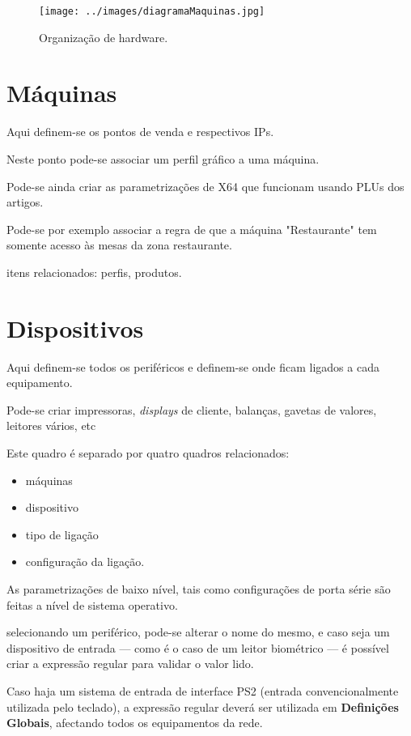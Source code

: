 \documentclass[a4paper,11pt,openany]{memoir}
\begin{document}
\begin{figure}
\texttt{[image: ../images/diagramaMaquinas.jpg]}
\caption[Submanifold]{Organização de hardware.}
\end{figure}

\section{Máquinas}

Aqui definem-se os pontos de venda  e respectivos IPs.

Neste ponto pode-se associar um perfil gráfico a uma máquina.

Pode-se ainda criar as parametrizações de X64 que funcionam usando PLUs dos artigos.

Pode-se por exemplo associar a regra de que a máquina "Restaurante" tem somente acesso às mesas da zona restaurante. 

itens relacionados: perfis, produtos.

\section{Dispositivos}

Aqui definem-se todos os periféricos e definem-se onde ficam ligados a cada equipamento.

Pode-se criar impressoras, \emph{displays} de cliente, balanças, gavetas de valores, leitores vários, etc

Este quadro é separado por quatro quadros relacionados: 
\begin{itemize}
\item máquinas
\item dispositivo
\item tipo de ligação
\item configuração da ligação.
\end{itemize}

As parametrizações de baixo nível, tais como configurações de porta série são feitas a nível de sistema operativo.

selecionando um periférico, pode-se alterar o nome do mesmo, e caso seja um dispositivo de entrada --- como é o caso 
de um leitor biométrico --- é possível criar a expressão regular para validar o valor lido.

Caso haja um sistema de entrada de interface PS2 (entrada convencionalmente utilizada pelo teclado), 
a expressão regular deverá ser utilizada em \textbf{Definições Globais}, afectando todos os equipamentos da rede.
\end{document}
